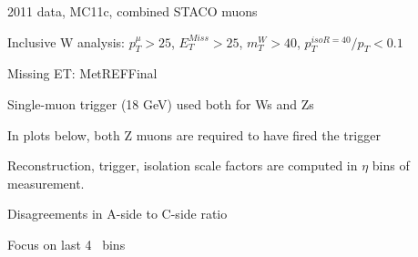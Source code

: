

{

 \iteb
 \item 2011 data, MC11c, combined STACO muons
 \item Inclusive W analysis: $p_T^{\mu}>25$, $E_T^{Miss}>25$, $m_T^{W}>40$, $p_{T}^{iso R=40}/p_{T}<0.1$
 \item Missing ET: MetREFFinal
 \item Single-muon trigger (18 GeV) used both for Ws and Zs
 \iteb
 \item In plots below, both Z muons are required to have fired the trigger
 \itee
 \item Reconstruction, trigger, isolation scale factors are computed in $\eta$ bins of measurement.
 \item Disagreements in A-side to C-side ratio
 \item Focus on last 4 \eta\ bins
 \itee

}

